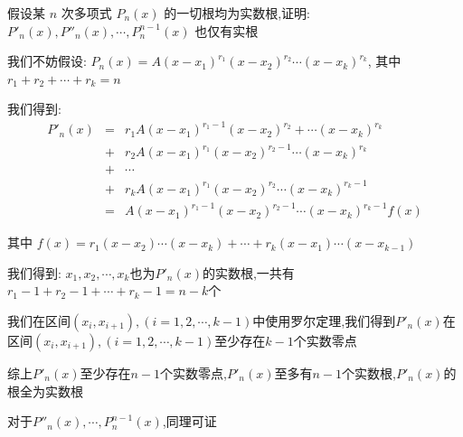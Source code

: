 \begin{proposition}
	假设某 $n$ 次多项式 $P_{n}(x)$ 的一切根均为实数根,证明: $P'_{n}(x),P''_{n}(x),\cdots,P_{n}^{n-1}(x)$ 也仅有实根
\end{proposition}
\begin{solution}

	我们不妨假设:  $P_{n}(x)=A(x-x_{1})^{r_{1}}(x-x_{2})^{r_{2}}\cdots(x-x_{k})^{r_{k}}$, 其中 $r_{1}+r_{2}+\cdots+r_{k}=n$

	我们得到:
	\begin{eqnarray*}
		P'_{n}(x)&=&r_{1}A(x-x_{1})^{r_{1}-1}(x-x_{2})^{r_{2}}+\cdots(x-x_{k})^{r_{k}}\\
		&+&r_{2}A(x-x_{1})^{r_{1}}(x-x_{2})^{r_{2}-1}\cdots(x-x_{k})^{r_{k}}\\
		&+&\cdots\\
		&+&r_{k}A(x-x_{1})^{r_{1}}(x-x_{2})^{r_{2}}\cdots(x-x_{k})^{r_{k}-1}\\
		&=&A(x-x_{1})^{r_{1}-1}(x-x_{2})^{r_{2}-1}\cdots(x-x_{k})^{r_{k}-1}f(x)
	\end{eqnarray*}

	其中 $f(x)=r_{1}(x-x_{2})\cdots(x-x_{k})+\cdots+r_{k}(x-x_{1})\cdots(x-x_{k-1})$

	我们得到:  $x_{1},x_{2},\cdots,x_{k}$也为$P'_{n}(x)$的实数根,一共有$r_{1}-1+r_{2}-1+\cdots+r_{k}-1=n-k$个

	我们在区间$(x_{i},x_{i+1}),(i=1,2,\cdots,k-1)$中使用罗尔定理,我们得到$P'_{n}(x)$在区间$(x_{i},x_{i+1}),(i=1,2,\cdots,k-1)$至少存在$k-1$个实数零点

	综上$P'_{n}(x)$至少存在$n-1$个实数零点,$P'_{n}(x)$至多有$n-1$个实数根,$P'_{n}(x)$的根全为实数根

	对于$P''_{n}(x),\cdots,P_{n}^{n-1}(x)$,同理可证

\end{solution}


